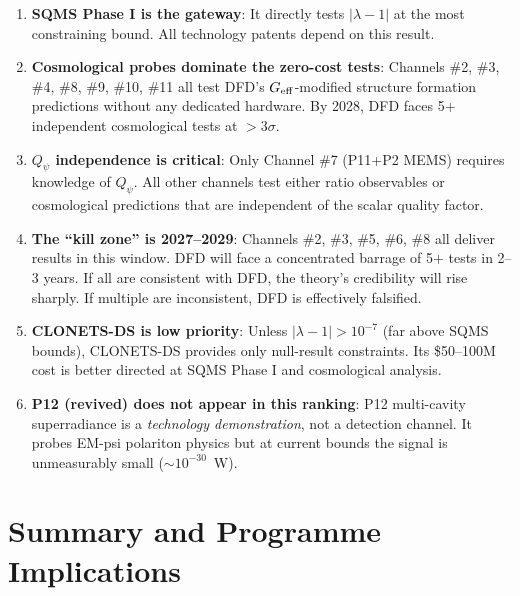 \documentclass[11pt]{article}
\begin{document}
\begin{enumerate}[nosep]
\item \textbf{SQMS Phase I is the gateway}: It directly tests
  $|\lambda - 1|$ at the most constraining bound. All technology
  patents depend on this result.

\item \textbf{Cosmological probes dominate the zero-cost tests}:
  Channels \#2, \#3, \#4, \#8, \#9, \#10, \#11 all test DFD's
  $G_{\rm eff}$-modified structure formation predictions without
  any dedicated hardware. By 2028, DFD faces 5+ independent
  cosmological tests at $>3\sigma$.

\item \textbf{$Q_\psi$ independence is critical}: Only Channel \#7
  (P11+P2 MEMS) requires knowledge of $Q_\psi$. All other channels
  test either ratio observables or cosmological predictions that
  are independent of the scalar quality factor.

\item \textbf{The ``kill zone'' is 2027--2029}: Channels \#2, \#3,
  \#5, \#6, \#8 all deliver results in this window. DFD will face
  a concentrated barrage of 5+ tests in 2--3 years. If all are
  consistent with DFD, the theory's credibility will rise sharply.
  If multiple are inconsistent, DFD is effectively falsified.

\item \textbf{CLONETS-DS is low priority}: Unless $|\lambda - 1|
  > 10^{-7}$ (far above SQMS bounds), CLONETS-DS provides only
  null-result constraints. Its \$50--100M cost is better directed
  at SQMS Phase I and cosmological analysis.

\item \textbf{P12 (revived) does not appear in this ranking}:
  P12 multi-cavity superradiance is a \emph{technology demonstration},
  not a detection channel. It probes EM-psi polariton physics but
  at current bounds the signal is unmeasurably small ($\sim 10^{-30}$~W).
\end{enumerate}


\section*{Summary and Programme Implications}
\end{document}
